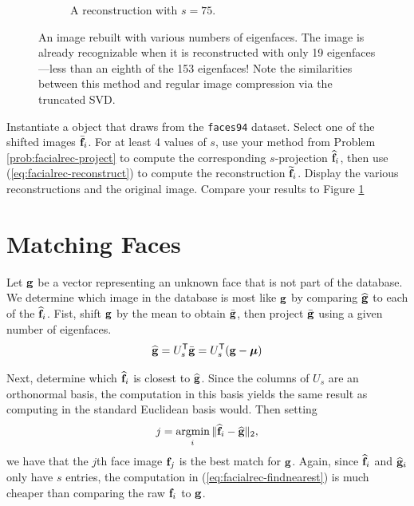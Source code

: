 \begin{figure}[H]
\begin{subfigure}{0.32\textwidth}
    \caption{A reconstruction with $s=75$.}
\end{subfigure}
\caption{An image rebuilt with various numbers of eigenfaces. The image is already recognizable when it is reconstructed with only 19 eigenfaces---less than an eighth of the 153 eigenfaces! Note the similarities between this method and regular image compression via the truncated SVD.}
\label{fig:rebuiltImage}
\end{figure}

\begin{problem}
Instantiate a  object that draws from the \texttt{faces94} dataset.
Select one of the shifted images $\bar{\mathbf{f}}_i$.
For at least 4 values of $s$, use your method from Problem \ref{prob:facialrec-project} to compute the corresponding $s$-projection $\widehat{\mathbf{f}}_i$, then use (\ref{eq:facialrec-reconstruct}) to compute the reconstruction $\widetilde{\mathbf{f}}_i$.
Display the various reconstructions and the original image.
Compare your results to Figure \ref{fig:rebuiltImage}
\end{problem}

\section*{Matching Faces} %

Let $\mathbf{g}$ be a vector representing an unknown face that is not part of the database.
We determine which image in the database is most like $\mathbf{g}$ by comparing $\widehat{\mathbf{g}}$ to each of the $\widehat{\mathbf{f}}_i$.
Fist, shift $\mathbf{g}$ by the mean to obtain $\bar{\mathbf{g}}$, then project $\bar{\mathbf{g}}$ using a given number of eigenfaces.
\begin{equation}
    \widehat{\mathbf{g}} = U_s^{\mathsf T}\bar{\mathbf{g}} = U_s^{\mathsf T}(\mathbf{g} - \boldsymbol{\mu})
    \label{eq:facialrec-unknownface}
\end{equation}

Next, determine which $\widehat{\mathbf{f}}_i$ is closest to $\widehat{\mathbf{g}}$.
Since the columns of $U_s$ are an orthonormal basis, the computation in this basis yields the same result as computing in the standard Euclidean basis would.
Then setting
\begin{equation}
j = \mathop{{\text{argmin}}\vphantom{\sim}}\limits_{\displaystyle _{i}} \|\widehat{\f}_i - \widehat{\g}\|_2, %
\label{eq:facialrec-findnearest}
\end{equation}
we have that the $j$th face image $\mathbf{f}_j$ is the best match for $\mathbf{g}$.
Again, since $\widehat{\mathbf{f}}_i$ and $\widehat{\mathbf{g}}_i$ only have $s$ entries, the computation in (\ref{eq:facialrec-findnearest}) is much cheaper than comparing the raw $\mathbf{f}_i$ to $\mathbf{g}$.

